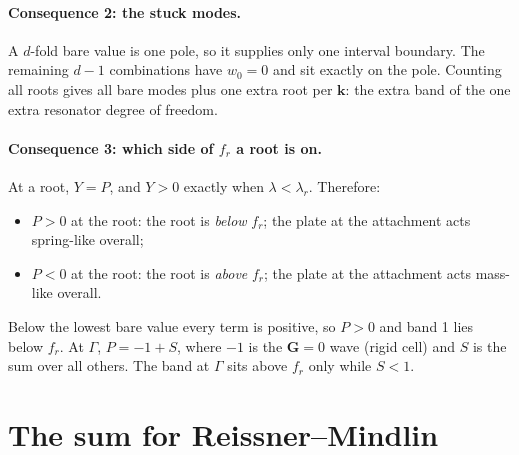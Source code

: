 \paragraph{Consequence 2: the stuck modes.}
A $d$-fold bare value is one pole, so it supplies only one interval boundary. The
remaining $d-1$ combinations have $w_0 = 0$ and sit exactly on the pole. Counting
all roots gives all bare modes plus one extra root per $\mathbf{k}$: the extra
band of the one extra resonator degree of freedom.

\paragraph{Consequence 3: which side of $f_r$ a root is on.}
At a root, $Y = P$, and $Y > 0$ exactly when $\lambda < \lambda_r$. Therefore:
\begin{itemize}
  \item $P > 0$ at the root: the root is \emph{below} $f_r$; the plate at the
        attachment acts spring-like overall;
  \item $P < 0$ at the root: the root is \emph{above} $f_r$; the plate at the
        attachment acts mass-like overall.
\end{itemize}
Below the lowest bare value every term is positive, so $P > 0$ and band 1 lies
below $f_r$. At $\Gamma$, $P = -1 + S$, where $-1$ is the $\mathbf{G}=0$ wave
(rigid cell) and $S$ is the sum over all others. The band at $\Gamma$ sits above
$f_r$ only while $S < 1$.

\section{The sum for Reissner--Mindlin}

